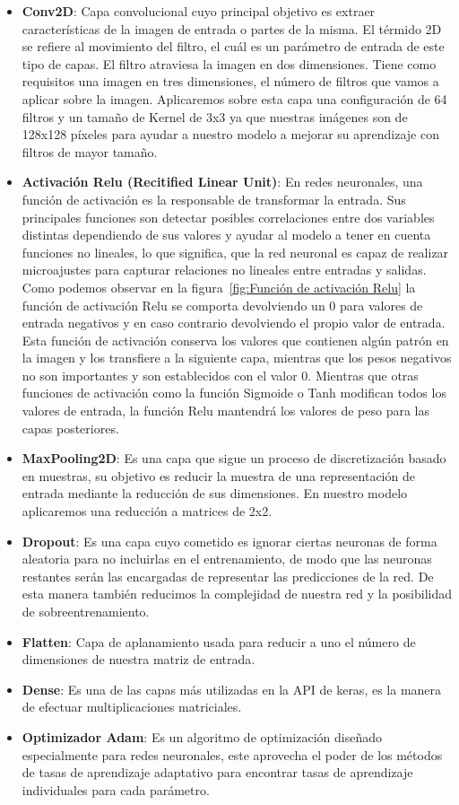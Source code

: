 \begin{itemize}
    \item \textbf{Conv2D}: Capa convolucional cuyo principal objetivo es extraer características de la imagen de entrada o partes de la misma.
    El térmido 2D se refiere al movimiento del filtro, el cuál es un parámetro de entrada de este tipo de capas.
    El filtro atraviesa la imagen en dos dimensiones.
    Tiene como requisitos una imagen en tres dimensiones, el número de filtros que vamos a aplicar sobre la imagen.
    Aplicaremos sobre esta capa una configuración de 64 filtros y un tamaño de Kernel de 3x3 ya que nuestras imágenes son de 128x128 píxeles para ayudar a nuestro modelo a mejorar su aprendizaje con filtros de mayor tamaño.
    \item \textbf{Activación Relu (Recitified Linear Unit)}: En redes neuronales, una función de activación es la responsable de transformar la entrada.
    Sus principales funciones son detectar posibles correlaciones entre dos variables distintas dependiendo de sus valores y ayudar al modelo a tener en cuenta funciones no lineales, lo que significa, que la red neuronal es capaz de realizar microajustes para capturar relaciones no lineales entre entradas y salidas.
    Como podemos observar en la figura~\ref{fig:Función de activación Relu} la función de activación Relu se comporta devolviendo un 0 para valores de entrada negativos y en caso contrario devolviendo el propio valor de entrada.
    Esta función de activación conserva los valores que contienen algún patrón en la imagen y los transfiere a la siguiente capa, mientras que los pesos negativos no son importantes y son establecidos con el valor 0.
    Mientras que otras funciones de activación como la función Sigmoide o Tanh modifican todos los valores de entrada, la función Relu mantendrá los valores de peso para las capas posteriores.
    \item \textbf{MaxPooling2D}: Es una capa que sigue un proceso de discretización basado en muestras, su objetivo es reducir la muestra de una representación de entrada mediante la reducción de sus dimensiones.
    En nuestro modelo aplicaremos una reducción a matrices de 2x2.
    \item \textbf{Dropout}: Es una capa cuyo cometido es ignorar ciertas neuronas de forma aleatoria para no incluirlas en el entrenamiento, de modo que las neuronas restantes serán las encargadas de representar las predicciones de la red.
    De esta manera también reducimos la complejidad de nuestra red y la posibilidad de sobreentrenamiento.
    \item \textbf{Flatten}: Capa de aplanamiento usada para reducir a uno el número de dimensiones de nuestra matriz de entrada.
    \item \textbf{Dense}: Es una de las capas más utilizadas en la API de keras, es la manera de efectuar multiplicaciones matriciales.
    \item \textbf{Optimizador Adam}: Es un algoritmo de optimización diseñado especialmente para redes neuronales, este aprovecha el poder de los métodos de tasas de aprendizaje adaptativo para encontrar tasas de aprendizaje individuales para cada parámetro.
\end{itemize}

